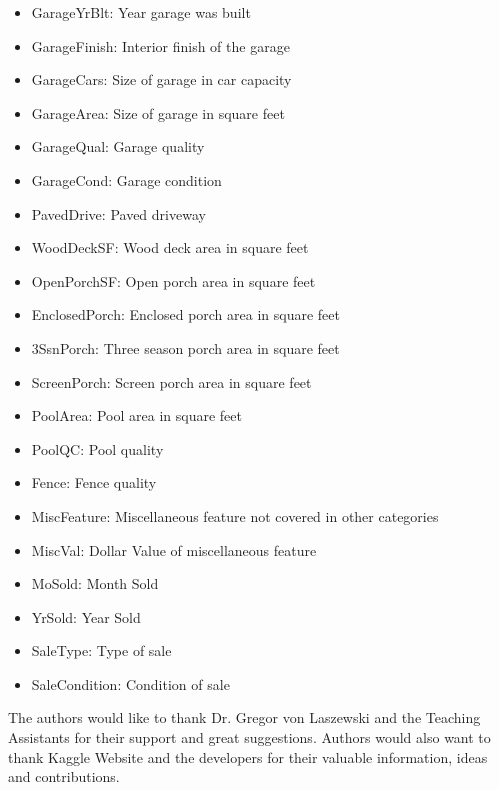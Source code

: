 \documentclass[sigconf]{acmart}
\begin{document}
\begin{itemize}
		\item GarageYrBlt: Year garage was built
		\item GarageFinish: Interior finish of the garage
		\item GarageCars: Size of garage in car capacity
		\item GarageArea: Size of garage in square feet
		\item GarageQual: Garage quality
		\item GarageCond: Garage condition
		\item PavedDrive: Paved driveway
		\item WoodDeckSF: Wood deck area in square feet
		\item OpenPorchSF: Open porch area in square feet
		\item EnclosedPorch: Enclosed porch area in square feet
		\item 3SsnPorch: Three season porch area in square feet
		\item ScreenPorch: Screen porch area in square feet
		\item PoolArea: Pool area in square feet
		\item PoolQC: Pool quality
		\item Fence: Fence quality
		\item MiscFeature: Miscellaneous feature not covered in other categories
		\item MiscVal: Dollar Value of miscellaneous feature
		\item MoSold: Month Sold
		\item YrSold: Year Sold
		\item SaleType: Type of sale
		\item SaleCondition: Condition of sale
	\end{itemize}
	
	\nocite{*}
	
	\begin{acks}	
		The authors would like to thank Dr. Gregor von Laszewski and the Teaching Assistants for their support and great suggestions. Authors would also want to thank Kaggle Website and the developers for their valuable information, ideas and contributions.		
	\end{acks}
	
	
	
	 	
	
	
\end{document}

